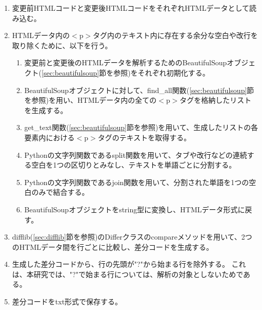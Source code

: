 \begin{enumerate}
    \item 変更前HTMLコードと変更後HTMLコードをそれぞれHTMLデータとして読み込む。
    \item HTMLデータ内の$<$p$>$タグ内のテキスト内に存在する余分な空白や改行を取り除くために、以下を行う。
          \begin{enumerate}
              \item 変更前と変更後のHTMLデータを解析するためのBeautifulSoupオブジェクト(\ref{sec:beautifulsoup}節を参照)をそれぞれ初期化する。
              \item BeautifulSoupオブジェクトに対して、find\_all関数(\ref{sec:beautifulsoup}節を参照)を用い、HTMLデータ内の全ての$<$p$>$タグを格納したリストを生成する。
              \item get\_text関数(\ref{sec:beautifulsoup}節を参照)を用いて、生成したリストの各要素内における$<$p$>$タグのテキストを取得する。
              \item Pythonの文字列関数であるsplit関数を用いて、タブや改行などの連続する空白を1つの区切りとみなし、テキストを単語ごとに分割する。
              \item Pythonの文字列関数であるjoin関数を用いて、分割された単語を1つの空白のみで結合する。
              \item BeautifulSoupオブジェクトをstring型に変換し、HTMLデータ形式に戻す。
          \end{enumerate}
    \item difflib(\ref{sec:difflib}節を参照)のDifferクラスのcompareメソッドを用いて、2つのHTMLデータ間を行ごとに比較し、差分コードを生成する。
    \item 生成した差分コードから、行の先頭が"?"から始まる行を除外する。
          これは、本研究では、"?"で始まる行については、解析の対象としないためである。
    \item 差分コードをtxt形式で保存する。
\end{enumerate}



